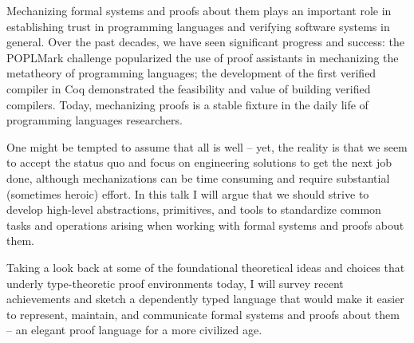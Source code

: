 \newpage



\talkabstract Mechanizing formal systems and proofs about them plays an
important role in establishing trust in programming languages and verifying
software systems in general. Over the past decades, we have seen significant
progress and success: the POPLMark challenge popularized the use of proof
assistants in mechanizing the metatheory of programming languages; the
development of the first verified compiler in Coq demonstrated the feasibility
and value of building verified compilers. Today, mechanizing proofs is a
stable fixture in the daily life of programming languages researchers.

One might be tempted to assume that all is well – yet, the reality is that we
seem to accept the status quo and focus on engineering solutions to get the
next job done, although mechanizations can be time consuming and require
substantial (sometimes heroic) effort. In this talk I will argue that we
should strive to develop high-level abstractions, primitives, and tools to
standardize common tasks and operations arising when working with formal
systems and proofs about them.

Taking a look back at some of the foundational theoretical ideas and choices
that underly type-theoretic proof environments today, I will survey recent
achievements and sketch a dependently typed language that would make it easier
to represent, maintain, and communicate formal systems and proofs about them –
an elegant proof language for a more civilized age.


\bio

\newpage
